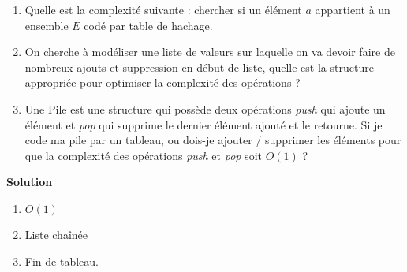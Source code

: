 \begin{exercice}
\begin{enumerate}
\item Quelle est la complexité suivante : chercher si un élément $a$ appartient à un ensemble $E$ codé par table de hachage.
\item On cherche à modéliser une liste de valeurs sur laquelle on va devoir faire de nombreux ajouts et suppression en début de liste, 
quelle est la structure appropriée pour optimiser la complexité des opérations ?
\item Une Pile est une structure qui possède deux opérations \emph{push} qui ajoute un élément et \emph{pop} qui supprime le dernier élément ajouté et le retourne. Si je code ma pile par un tableau, ou dois-je ajouter / supprimer les éléments pour que la complexité des opérations \emph{push} et \emph{pop} soit $O(1)$ ? 
\end{enumerate}

\textbf{Solution}

\begin{enumerate}
\item $O(1)$
\item Liste chaînée
\item Fin de tableau.
\end{enumerate}

\end{exercice}